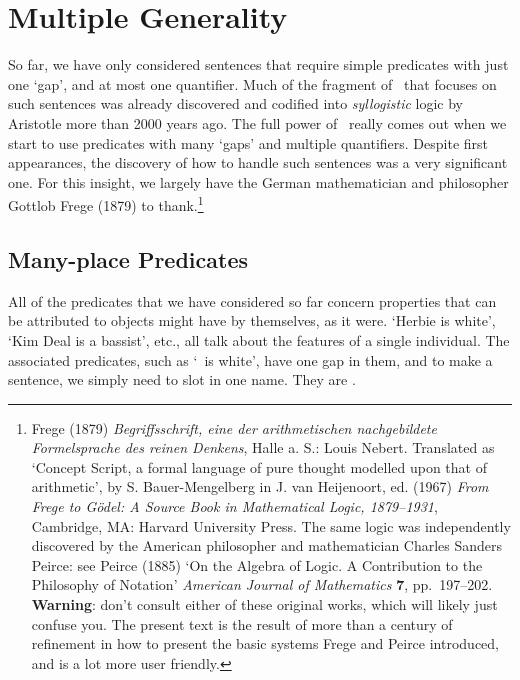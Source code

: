 \chapter{Multiple Generality}\label{s:MultipleGenerality}
So far, we have only considered sentences that require simple predicates with just one `gap', and at most one quantifier. Much of the fragment of \FOL\ that focuses on such sentences was already discovered and codified into \emph{syllogistic} logic by Aristotle more than 2000 years ago. The full power of \FOL\ really comes out when we start to use predicates with many `gaps' and multiple quantifiers. Despite first appearances, the discovery of how to handle such sentences was a very significant one.  For this insight, we largely have the German mathematician and philosopher Gottlob Frege (1879) to thank.\footnote{Frege (1879) \emph{Begriffsschrift, eine der arithmetischen nachgebildete Formelsprache des reinen Denkens}, Halle a. S.: Louis Nebert. Translated as `Concept Script, a formal language of pure thought modelled upon that of arithmetic', by S. Bauer-Mengelberg in J. van Heijenoort, ed. (1967) \emph{From Frege to Gödel: A Source Book in Mathematical Logic, 1879–1931}, Cambridge, MA: Harvard University Press. The same logic was independently discovered by the American philosopher and mathematician Charles Sanders Peirce: see Peirce (1885) `On the Algebra of Logic. A Contribution to the Philosophy of Notation' \emph{American Journal of Mathematics} \textbf{7}, pp.\ 197–202. \textbf{Warning}: don't consult either of these original works, which will likely just confuse you. The present text is the result of more than a century of refinement in how to present the basic systems Frege and Peirce introduced, and is a lot more user friendly.}



\section{Many-place Predicates}
All of the predicates that we have considered so far concern properties that can be attributed to objects might have by themselves, as it were. `Herbie is white', `Kim Deal is a bassist', etc., all talk about the features of a single individual. The associated predicates, such as `\blank\ is white', have one gap in them, and to make a sentence, we simply need to slot in one name. They are . 

